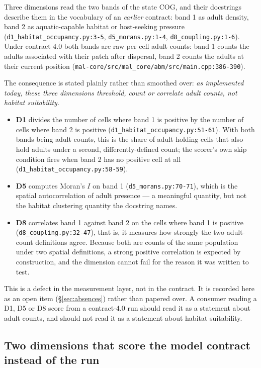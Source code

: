 \documentclass[11pt,a4paper]{article}
\newcommand{\code}[1]{\texttt{#1}}
\begin{document}
Three dimensions read the two bands of the state COG, and their docstrings
describe them in the vocabulary of an \emph{earlier} contract: band 1 as
adult density, band 2 as aquatic-capable habitat or host-seeking pressure
(\code{d1\_habitat\_occupancy.py:3-5}, \code{d5\_morans.py:1-4},
\code{d8\_coupling.py:1-6}). Under contract 4.0 both bands are raw
per-cell adult counts: band 1 counts the adults associated with their patch
after dispersal, band 2 counts the adults at their current position
(\code{mal-core/src/mal\_core/abm/src/main.cpp:386-390}).

The consequence is stated plainly rather than smoothed over: \emph{as
implemented today, these three dimensions threshold, count or correlate
adult counts, not habitat suitability}.

\begin{itemize}
\item \textbf{D1} divides the number of cells where band 1 is positive by
      the number of cells where band 2 is positive
      (\code{d1\_habitat\_occupancy.py:51-61}). With both bands being adult
      counts, this is the share of adult-holding cells that also hold adults
      under a second, differently-defined count; the scorer's own skip
      condition fires when band 2 has no positive cell at all
      (\code{d1\_habitat\_occupancy.py:58-59}).
\item \textbf{D5} computes Moran's $I$ on band 1
      (\code{d5\_morans.py:70-71}), which is the spatial autocorrelation of
      adult presence --- a meaningful quantity, but not the habitat
      clustering quantity the docstring names.
\item \textbf{D8} correlates band 1 against band 2 on the cells where band 1
      is positive (\code{d8\_coupling.py:32-47}), that is, it measures how
      strongly the two adult-count definitions agree. Because both are
      counts of the same population under two spatial definitions, a strong
      positive correlation is expected by construction, and the dimension
      cannot fail for the reason it was written to test.
\end{itemize}

This is a defect in the measurement layer, not in the contract. It is
recorded here as an open item (\S\ref{sec:absences}) rather than papered
over. A consumer reading a D1, D5 or D8 score from a contract-4.0 run should
read it as a statement about adult counts, and should not read it as a
statement about habitat suitability.

\subsection{Two dimensions that score the model contract instead of the run}
\label{sec:contractdims}
\end{document}
